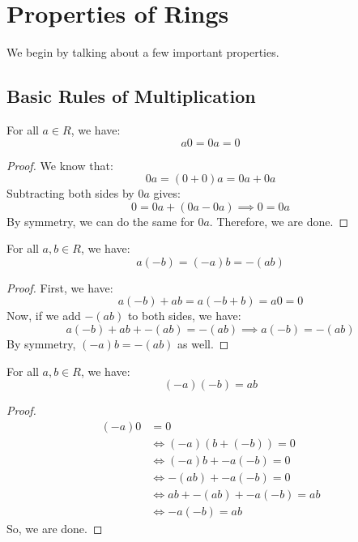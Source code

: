\documentclass[letterpaper]{article}
\begin{document}
\section{Properties of Rings}
We begin by talking about a few important properties. 

\subsection{Basic Rules of Multiplication}
\begin{theorem}{}{}
    For all $a \in R$, we have: 
    \[a0 = 0a = 0\]
\end{theorem}

\begin{mdframed}[]
    \begin{proof}
        We know that: 
        \[0a = (0 + 0)a = 0a + 0a\]
        Subtracting both sides by $0a$ gives: 
        \[0 = 0a + (0a - 0a) \implies 0 = 0a\]
        By symmetry, we can do the same for $0a$. Therefore, we are done.
    \end{proof}    
\end{mdframed}

\begin{theorem}{}{}
    For all $a, b \in R$, we have:
    \[a(-b) = (-a)b = -(ab)\]
\end{theorem}

\begin{mdframed}[]
    \begin{proof}
        First, we have: 
        \[a(-b) + ab = a(-b + b) = a0 = 0\]
        Now, if we add $-(ab)$ to both sides, we have: 
        \[a(-b) + ab + -(ab) = -(ab) \implies a(-b) = -(ab)\]
        By symmetry, $(-a)b = -(ab)$ as well. 
    \end{proof}
\end{mdframed}

\begin{theorem}{}{}
    For all $a, b \in R$, we have: 
    \[(-a)(-b) = ab\]
\end{theorem}

\begin{mdframed}[]
    \begin{proof}
        \begin{equation*}
            \begin{aligned}
                (-a)0 &= 0 \\ 
                    &\iff (-a)(b + (-b)) = 0 \\ 
                    &\iff (-a)b + -a(-b) = 0 \\ 
                    &\iff -(ab) + -a(-b) = 0 \\ 
                    &\iff ab + -(ab) + -a(-b) = ab \\
                    &\iff -a(-b) = ab
            \end{aligned}
        \end{equation*}
        So, we are done. 
    \end{proof}
\end{mdframed}
\end{document}

